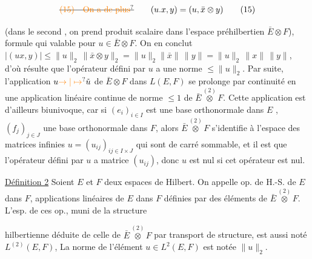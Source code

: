 
\[
\deleted{\unsure{(15)\quad\text{On a de plus}}}\qquad (u.x,y)=(u,\bar x\otimes y) \tag*{(15)}
\]

 
(dans le second , on prend  produit scalaire
dans l'espace préhilbertien $\bar E\otimes F$), formule qui
 valable  pour  $u\in\bar E\otimes F$. On en
conclut  $|(ux,y)|\leq\|u\|_2\,\|\bar x\otimes y\|_2=\|u\|_2\|\bar x\|\,\|y\|
=\|u\|_2\,\|x\|\,\|y\|$, d'où résulte que l'opérateur
défini par $u$ a une norme $\leq\|u\|_2$. Par
suite, l'application $u\unsure{\to|\mapsto}\tilde u$ de $\bar E\otimes F$ dans $L(E,F)$
se prolonge par continuité en une application linéaire
continue de  norme $\leq 1$ de $\bar E\overset{(2)}{\otimes}F$. Cette
application est d'ailleurs biunivoque, car si $(e_i)_{i\in I}$ est
une base orthonormale dans $E$ , $(f_j)_{j\in J}$ une base
orthonormale dans $F$, alors $\bar E\overset{(2)}{\otimes}F$ s'identifie
à l'espace  des matrices infinies
$u=(u_{ij})_{ij\in I\times J}$ qui sont de carré sommable,  et
il est   que l'opérateur  défini par $u$
a   matrice $(u_{ij})$, donc $u$ est nul si cet
opérateur est nul. 

\uline{Définition 2} Soient $E$ et $F$ deux espaces de Hilbert.
On appelle op. de H.-S. de $E$ dans $F$,   applications
linéaires de $E$ dans $F$ définies par des éléments
de $\bar E\overset{(2)}{\otimes} F$. L'esp. de ces op.,  muni de la structure

hilbertienne déduite de celle de $\bar E\overset{(2)}{\otimes}F$ par transport
de structure, est aussi noté $L^{(2)}(E,F)$,  La norme de 
 l'élément $u\in L^2(E,F)$ est notée $\|u\|_2$.

